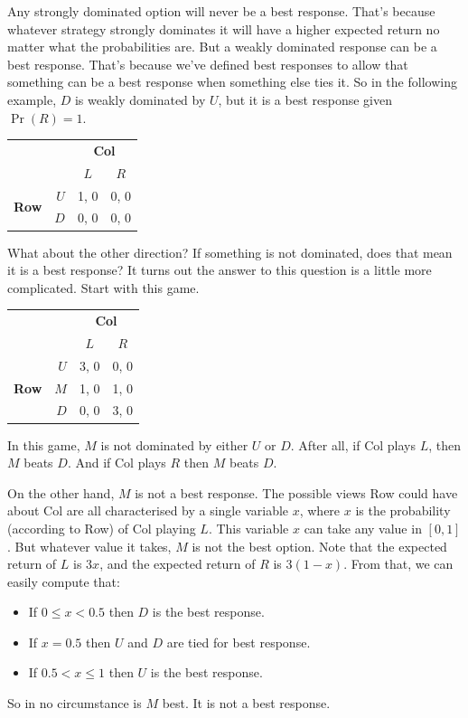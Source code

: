 \documentclass[openany]{book}
\begin{document}
Any strongly dominated option will never be a best response. That's because whatever strategy strongly dominates it will have a higher expected return no matter what the probabilities are. But a weakly dominated response can be a best response. That's because we've defined best responses to allow that something can be a best response when something else ties it. So in the following example, $D$ is weakly dominated by $U$, but it is a best response given $\Pr(R) = 1$.

\begin{center}
\begin{tabular}{l r | c c}
& & \multicolumn{2}{c}{\textbf{Col}} \\
& & $L$ & $R$ \\ \hline
\multirow{2}{*}{\textbf{Row}} & $U$ & 1, 0 & 0, 0 \\
& $D$ & 0, 0 & 0, 0
\end{tabular}
\end{center}
What about the other direction? If something is not dominated, does that mean it is a best response? It turns out the answer to this question is a little more complicated. Start with this game.

\begin{center}
\begin{tabular}{l r | c c}
& & \multicolumn{2}{c}{\textbf{Col}} \\
& & $L$ & $R$ \\ \hline
\multirow{3}{*}{\textbf{Row}} & $U$ & 3, 0 & 0, 0 \\
& $M$ & 1, 0 & 1, 0 \\
& $D$ & 0, 0 & 3, 0
\end{tabular}
\end{center}
In this game, $M$ is not dominated by either $U$ or $D$. After all, if Col plays $L$, then $M$ beats $D$. And if Col plays $R$ then $M$ beats $D$.

On the other hand, $M$ is not a best response. The possible views Row could have about Col are all characterised by a single variable $x$, where $x$ is the probability (according to Row) of Col playing $L$. This variable $x$ can take any value in $[0, 1]$. But whatever value it takes, $M$ is not the best option. Note that the expected return of $L$ is $3x$, and the expected return of $R$ is $3(1-x)$. From that, we can easily compute that:

\begin{itemize}
\item If $0 \leq x < 0.5$ then $D$ is the best response.
\item If $x = 0.5$ then $U$ and $D$ are tied for best response.
\item If $0.5 < x \leq 1$ then $U$ is the best response.
\end{itemize}
So in no circumstance is $M$ best. It is not a best response.
\end{document}
